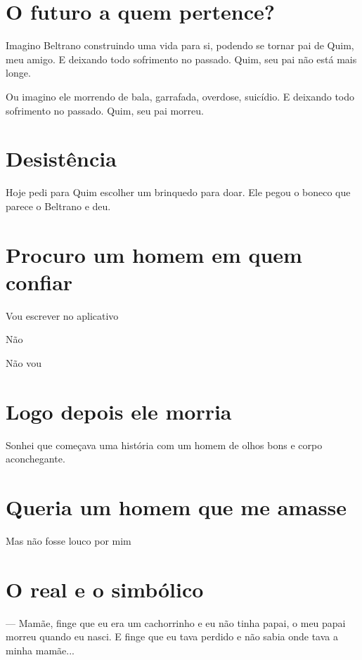\chapter{O futuro a quem pertence?}\label{o-futuro-a-quem-pertence}


Imagino Beltrano construindo uma vida para si, podendo se tornar pai de
Quim, meu amigo. E deixando todo sofrimento no passado. Quim, seu pai
não está mais longe.

Ou imagino ele morrendo de bala, garrafada, overdose, suicídio. E
deixando todo sofrimento no passado. Quim, seu pai morreu.

\chapter{Desistência}\label{desistuxeancia}

Hoje pedi para Quim escolher um brinquedo para doar. Ele pegou o boneco
que parece o Beltrano e deu.

{\parindent0pt\parskip1pt\raggedright

\chapter{Procuro um homem em quem
confiar}\label{procuro-um-homem-em-quem-confiar}

Vou escrever no aplicativo

Não

Não vou

\chapter{Logo depois ele morria}\label{logo-depois-ele-morria}

Sonhei que começava uma história com um homem de olhos bons e corpo
aconchegante.

\chapter{Queria um homem que me
amasse}\label{queria-um-homem-que-me-amasse}

Mas não fosse louco por mim}


\chapter{O real e o simbólico}

--- Mamãe, finge que eu era um cachorrinho e eu não tinha papai, o meu
papai morreu quando eu nasci. E finge que eu tava perdido e não sabia
onde tava a minha mamãe...

